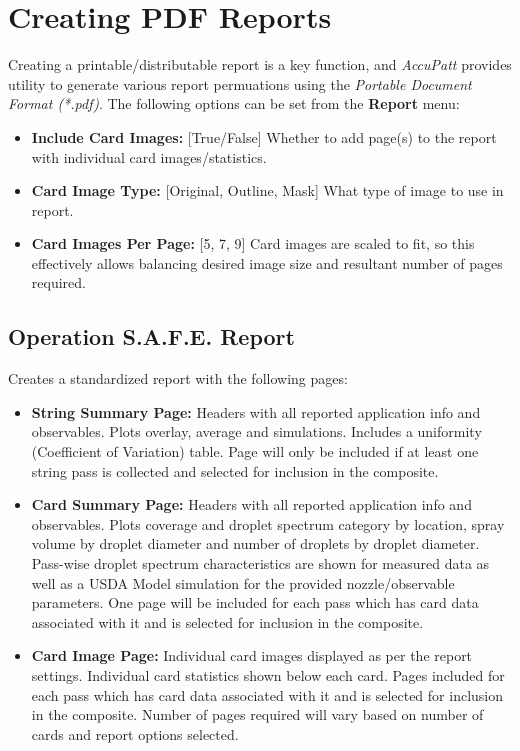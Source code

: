 \documentclass[10pt,letterpaper,titlepage]{article}
\begin{document}
    \section{Creating PDF Reports}
    Creating a printable/distributable report is a key function, and \textit{AccuPatt} provides utility to generate various report permuations using the \textit{Portable Document Format (*.pdf)}. The following options can be set from the \textbf{Report} menu:
    \begin{itemize}
        \item \textbf{Include Card Images:} [True/False] Whether to add page(s) to the report with individual card images/statistics.
        \item \textbf{Card Image Type:} [Original, Outline, Mask] What type of image to use in report.
        \item \textbf{Card Images Per Page:} [5, 7, 9] Card images are scaled to fit, so this effectively allows balancing desired image size and resultant number of pages required.
    \end{itemize}

    \subsection{Operation S.A.F.E. Report}
    Creates a standardized report with the following pages:
    \begin{itemize}
        \item \textbf{String Summary Page:} Headers with all reported application info and observables. Plots overlay, average and simulations. Includes a uniformity (Coefficient of Variation) table. Page will only be included if at least one string pass is collected and selected for inclusion in the composite.
        \item \textbf{Card Summary Page:} Headers with all reported application info and observables. Plots coverage and droplet spectrum category by location, spray volume by droplet diameter and number of droplets by droplet diameter. Pass-wise droplet spectrum characteristics are shown for measured data as well as a USDA Model simulation for the provided nozzle/observable parameters. One page will be included for each pass which has card data associated with it and is selected for inclusion in the composite.
        \item \textbf{Card Image Page:} Individual card images displayed as per the report settings. Individual card statistics shown below each card. Pages included for each pass which has card data associated with it and is selected for inclusion in the composite. Number of pages required will vary based on number of cards and report options selected.
    \end{itemize}
    \newpage
\end{document}
